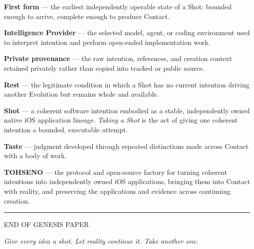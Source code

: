 \documentclass[11pt]{article}
\newcommand{\creedrule}{\begin{center}{\color{signal}\rule{2.2em}{1.2pt}}\end{center}}
\newcommand{\TOH}{TOHSENO}
\begin{document}
\textbf{First form} --- the earliest independently operable state of a
Shot: bounded enough to arrive, complete enough to produce Contact.

\textbf{Intelligence Provider} --- the selected model, agent, or coding
environment used to interpret intention and perform open-ended
implementation work.

\textbf{Private provenance} --- the raw intention, references, and
creation context retained privately rather than copied into tracked or
public source.

\textbf{Rest} --- the legitimate condition in which a Shot has no
current intention driving another Evolution but remains whole and
available.

\textbf{Shot} --- a coherent software intention embodied as a stable,
independently owned native iOS application lineage. \emph{Taking a
Shot} is the act of giving one coherent intention a bounded, executable
attempt.

\textbf{Taste} --- judgment developed through repeated distinctions made
across Contact with a body of work.

\textbf{\TOH{}} --- the protocol and open-source factory for turning
coherent intentions into independently owned iOS applications, bringing
them into Contact with reality, and preserving the applications and
evidence across continuing creation.

\vspace{2em}
\creedrule
\begin{center}
{\monolabel\scriptsize END OF GENESIS PAPER\par}
\vspace{0.8em}
{\itshape Give every idea a shot. Let reality continue it. Take another one.}
\end{center}
\end{document}
